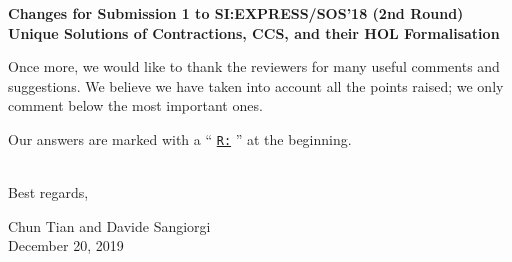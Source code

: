 \newcommand{\Mark}{{\underline{\tt R:} }}


\begin{center}
\textbf{
{\small Changes for Submission 1 to SI:EXPRESS/SOS'18 (2nd Round)}\\[5mm]
{\large Unique Solutions of Contractions, CCS, and their HOL
  Formalisation
}}
\end{center}



\vskip 10pt
\noindent

Once more, we would like to thank the reviewers for many useful
 comments and suggestions.
We believe we have taken into account all 
the points raised; we only comment below the most
important ones.

Our answers are marked  with a `` \Mark''  at the beginning.

\ \\

Best regards,
\begin{flushright}
  Chun Tian and Davide Sangiorgi \\
  December 20, 2019
\end{flushright}




